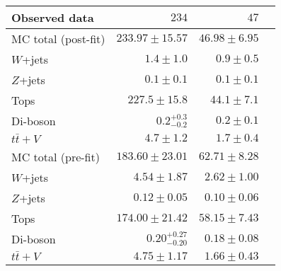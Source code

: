 \begin{table}
\begin{center}
\begin{tabular*}{\textwidth}{@{\extracolsep{\fill}}lrrr}
Observed data          & $234$              & $47$                    \\
\midrule
\midrule
MC total (post-fit)         & $233.97 \pm 15.57$          & $46.98 \pm 6.95$              \\
\midrule
        $W$+jets         & $1.4 \pm 1.0$          & $0.9 \pm 0.5$              \\
        $Z$+jets         & $0.1 \pm 0.1$          & $0.1 \pm 0.1$              \\
        Tops         & $227.5 \pm 15.8$          & $44.1 \pm 7.1$              \\
        Di-boson         & $0.2_{-0.2}^{+0.3}$          & $0.2 \pm 0.1$              \\
        $t\bar{t}+V$         & $4.7 \pm 1.2$          & $1.7 \pm 0.4$              \\
\midrule
\midrule
MC total (pre-fit)              & $183.60 \pm 23.01$          & $62.71 \pm 8.28$              \\
\midrule
        $W$+jets         & $4.54 \pm 1.87$          & $2.62 \pm 1.00$              \\
        $Z$+jets         & $0.12 \pm 0.05$          & $0.10 \pm 0.06$              \\
        Tops         & $174.00 \pm 21.42$          & $58.15 \pm 7.43$              \\
        Di-boson         & $0.20_{-0.20}^{+0.27}$          & $0.18 \pm 0.08$              \\
        $t\bar{t}+V$         & $4.75 \pm 1.17$          & $1.66 \pm 0.43$              \\
    \bottomrule
    \end{tabular*}
    
  \end{center}
\end{table}


